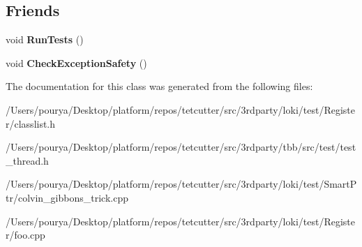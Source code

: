 \subsection*{Friends}
\begin{DoxyCompactItemize}
\item 
\hypertarget{structBase_a42dac6ca34e006a4c6eccfd7842df376}{}void {\bfseries Run\+Tests} ()\label{structBase_a42dac6ca34e006a4c6eccfd7842df376}

\item 
\hypertarget{structBase_a84f9141e5aecc728d8445144965aeb7c}{}void {\bfseries Check\+Exception\+Safety} ()\label{structBase_a84f9141e5aecc728d8445144965aeb7c}

\end{DoxyCompactItemize}


The documentation for this class was generated from the following files\+:\begin{DoxyCompactItemize}
\item 
/\+Users/pourya/\+Desktop/platform/repos/tetcutter/src/3rdparty/loki/test/\+Register/classlist.\+h\item 
/\+Users/pourya/\+Desktop/platform/repos/tetcutter/src/3rdparty/tbb/src/test/test\+\_\+thread.\+h\item 
/\+Users/pourya/\+Desktop/platform/repos/tetcutter/src/3rdparty/loki/test/\+Smart\+Ptr/colvin\+\_\+gibbons\+\_\+trick.\+cpp\item 
/\+Users/pourya/\+Desktop/platform/repos/tetcutter/src/3rdparty/loki/test/\+Register/foo.\+cpp\end{DoxyCompactItemize}
